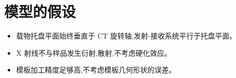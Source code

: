 \section{模型的假设}

\begin{itemize}
\item 载物托盘平面始终垂直于 CT 旋转轴,发射-接收系统平行于托盘平面。
\item X 射线不与样品发生衍射,散射,不考虑硬化效应。
\item 模板加工精度足够高,不考虑模板几何形状的误差。
\end{itemize}
